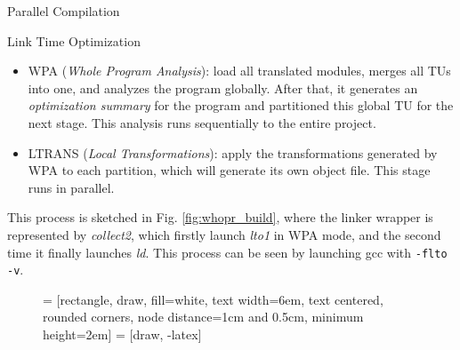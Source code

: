\begin{section}{Parallel Compilation}
\begin{subsection}{Link Time Optimization}
\begin{itemize}
\item WPA (\textit{Whole Program Analysis}): load all translated modules,
merges all TUs into one, and analyzes the program globally. After that, it
generates an \emph{optimization summary} for the program and partitioned this
global TU for the next stage. This analysis runs sequentially to the entire
project.

\item LTRANS (\textit{Local Transformations}): apply the transformations generated by
WPA to each partition, which will generate its own object file. This stage runs in
parallel.
\end{itemize}

This process is sketched in Fig. \ref{fig:whopr_build}, where the linker
wrapper is represented by \textit{collect2}, which firstly launch \textit{lto1}
in WPA mode, and the second time it finally launches \textit{ld}. This process
can be seen by launching gcc with \texttt{-flto -v}.

\begin{figure}
 = [rectangle, draw, fill=white,
    text width=6em, text centered, rounded corners, node distance=1cm and 0.5cm, minimum height=2em]
 = [draw, -latex]
\end{figure}
\end{subsection}
\end{section}
